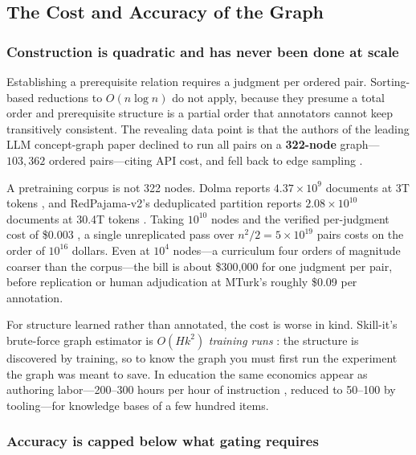 \documentclass[11pt]{article}
\theoremstyle{plain}
\theoremstyle{definition}
\theoremstyle{remark}
\begin{document}
\subsection{The Cost and Accuracy of the Graph}
\label{sec:graphcost}

\subsubsection{Construction is quadratic and has never been done at scale}

Establishing a prerequisite relation requires a judgment per ordered pair.
Sorting-based reductions to $O(n \log n)$ do not apply, because they presume a
total order and prerequisite structure is a partial order that annotators cannot
keep transitively consistent. The revealing data point is that the authors of the
leading LLM concept-graph paper declined to run all pairs on a \textbf{322-node}
graph---$103{,}362$ ordered pairs---citing API cost, and fell back to edge
sampling \citep{yang2024cgprompt}.

A pretraining corpus is not 322 nodes. Dolma reports $4.37 \times 10^9$ documents
at 3T tokens \citep{soldaini2024dolma}, and RedPajama-v2's deduplicated partition
reports $2.08 \times 10^{10}$ documents at 30.4T tokens \citep{weber2024redpajama}.
Taking $10^{10}$ nodes and the verified per-judgment cost of \$0.003
\citep{gilardi2023chatgpt}, a single unreplicated pass over $n^2/2 = 5 \times
10^{19}$ pairs costs on the order of $10^{16}$ dollars. Even at $10^4$ nodes---a
curriculum four orders of magnitude coarser than the corpus---the bill is about
\$300{,}000 for one judgment per pair, before replication or human adjudication
at MTurk's roughly \$0.09 per annotation.

For structure learned rather than annotated, the cost is worse in kind.
Skill-it's brute-force graph estimator is $O(Hk^2)$ \emph{training runs}
\citep{chen2023skillit}: the structure is discovered by training, so to know the
graph you must first run the experiment the graph was meant to save. In education
the same economics appear as authoring labor---200--300 hours per hour of
instruction \citep{aleven2010rule}, reduced to 50--100 by tooling---for knowledge
bases of a few hundred items.

\subsubsection{Accuracy is capped below what gating requires}
\end{document}
